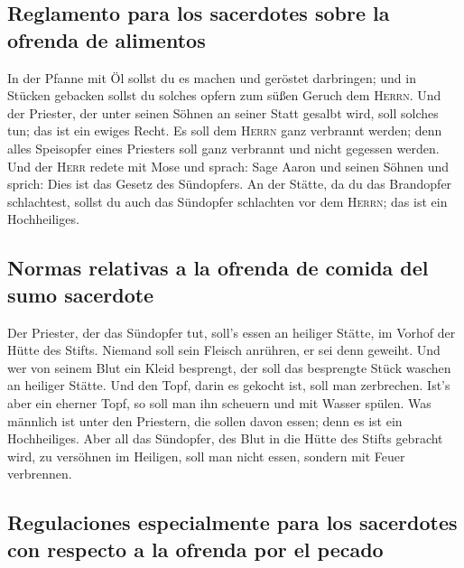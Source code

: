 \hypertarget{reglamento-para-los-sacerdotes-sobre-la-ofrenda-de-alimentos}{%
\subsection{Reglamento para los sacerdotes sobre la ofrenda de
alimentos}\label{reglamento-para-los-sacerdotes-sobre-la-ofrenda-de-alimentos}}

 In der Pfanne mit Öl sollst du es machen und geröstet
darbringen; und in Stücken gebacken sollst du solches opfern zum süßen
Geruch dem \textsc{Herrn}.  Und der Priester, der unter
seinen Söhnen an seiner Statt gesalbt wird, soll solches tun; das ist
ein ewiges Recht. Es soll dem \textsc{Herrn} ganz verbrannt werden;
 denn alles Speisopfer eines Priesters soll ganz
verbrannt und nicht gegessen werden.  Und der
\textsc{Herr} redete mit Mose und sprach:  Sage Aaron und
seinen Söhnen und sprich: Dies ist das Gesetz des Sündopfers. An der
Stätte, da du das Brandopfer schlachtest, sollst du auch das Sündopfer
schlachten vor dem \textsc{Herrn}; das ist ein Hochheiliges.

\hypertarget{normas-relativas-a-la-ofrenda-de-comida-del-sumo-sacerdote}{%
\subsection{Normas relativas a la ofrenda de comida del sumo
sacerdote}\label{normas-relativas-a-la-ofrenda-de-comida-del-sumo-sacerdote}}

 Der Priester, der das Sündopfer tut, soll's essen an
heiliger Stätte, im Vorhof der Hütte des Stifts.  Niemand
soll sein Fleisch anrühren, er sei denn geweiht. Und wer von seinem Blut
ein Kleid besprengt, der soll das besprengte Stück waschen an heiliger
Stätte.  Und den Topf, darin es gekocht ist, soll man
zerbrechen. Ist's aber ein eherner Topf, so soll man ihn scheuern und
mit Wasser spülen.  Was männlich ist unter den Priestern,
die sollen davon essen; denn es ist ein Hochheiliges. 
Aber all das Sündopfer, des Blut in die Hütte des Stifts gebracht wird,
zu versöhnen im Heiligen, soll man nicht essen, sondern mit Feuer
verbrennen.

\hypertarget{regulaciones-especialmente-para-los-sacerdotes-con-respecto-a-la-ofrenda-por-el-pecado}{%
\subsection{Regulaciones especialmente para los sacerdotes con respecto
a la ofrenda por el
pecado}\label{regulaciones-especialmente-para-los-sacerdotes-con-respecto-a-la-ofrenda-por-el-pecado}}

